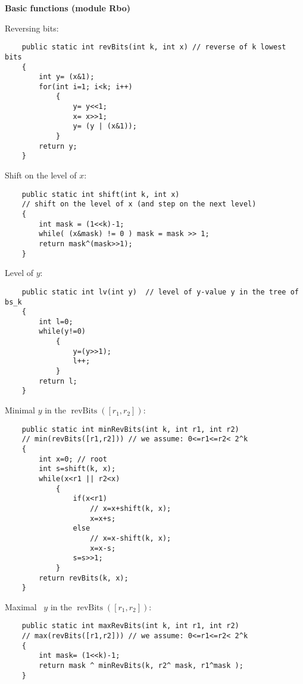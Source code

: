 \documentclass{letter}
\newcommand{\subsection}[1]{\medskip\bigskip

\noindent\textbf{\Large #1}}
\newcommand{\tmop}[1]{\ensuremath{\operatorname{#1}}}
\begin{document}
\subsection{Basic functions (module Rbo)}

Reversing bits:
\begin{verbatim}
    public static int revBits(int k, int x) // reverse of k lowest bits
    {
        int y= (x&1);
        for(int i=1; i<k; i++)
            {
                y= y<<1;
                x= x>>1;
                y= (y | (x&1));
            }
        return y;
    }
\end{verbatim}
Shift on the level of $x$:
\begin{verbatim}
    public static int shift(int k, int x) 
    // shift on the level of x (and step on the next level)
    {
        int mask = (1<<k)-1;
        while( (x&mask) != 0 ) mask = mask >> 1;
        return mask^(mask>>1);
    }

\end{verbatim}
Level of $y$:
\begin{verbatim}
    public static int lv(int y)  // level of y-value y in the tree of bs_k
    {
        int l=0;
        while(y!=0) 
            {
                y=(y>>1);
                l++;
            }
        return l;
    }
\end{verbatim}
Minimal $y$ in the $\tmop{revBits} ([r_1, r_2])$:
\begin{verbatim}
    public static int minRevBits(int k, int r1, int r2)
    // min(revBits([r1,r2])) // we assume: 0<=r1<=r2< 2^k
    {
        int x=0; // root
        int s=shift(k, x);
        while(x<r1 || r2<x)
            {
                if(x<r1)
                    // x=x+shift(k, x);
                    x=x+s;
                else
                    // x=x-shift(k, x);
                    x=x-s;
                s=s>>1;
            }
        return revBits(k, x);
    }
\end{verbatim}
Maximal \ $y$ in the $\tmop{revBits} ([r_1, r_2])$:
\begin{verbatim}
    public static int maxRevBits(int k, int r1, int r2)
    // max(revBits([r1,r2])) // we assume: 0<=r1<=r2< 2^k
    {
        int mask= (1<<k)-1;
        return mask ^ minRevBits(k, r2^ mask, r1^mask );
    }
\end{verbatim}
\end{document}
